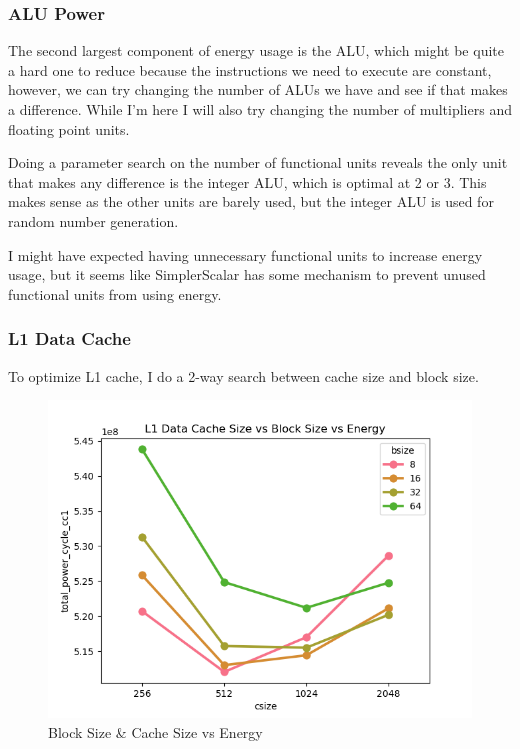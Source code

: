 \documentclass{article}
\newcommand{\optimisation}[1]{
  
}
\begin{document}
\begin{multicols}{2}
  \subsubsection{ALU Power}
  The second largest component of energy usage is the ALU, which might be quite a hard one to reduce because the instructions we need to execute are constant, however, we can try changing the number of ALUs we have and see if that makes a difference. While I'm here I will also try changing the number of multipliers and floating point units.

  Doing a parameter search on the number of functional units reveals the only unit that makes any difference is the integer ALU, which is optimal at 2 or 3. This makes sense as the other units are barely used, but the integer ALU is used for random number generation.



  \optimisation{reduce_ialu}

  I might have expected having unnecessary functional units to increase energy usage, but it seems like SimplerScalar has some mechanism to prevent unused functional units from using energy.

  \subsubsection{L1 Data Cache}
  To optimize L1 cache, I do a 2-way search between cache size and block size.

  \begin{figure}[H]
    \centering
    \includegraphics[width=\linewidth]{./assets/l1_vs_energy.png}
    \caption{Block Size \& Cache Size vs Energy}
    \label{fig:l1_vs_energy}
  \end{figure}


\end{multicols}
\end{document}

